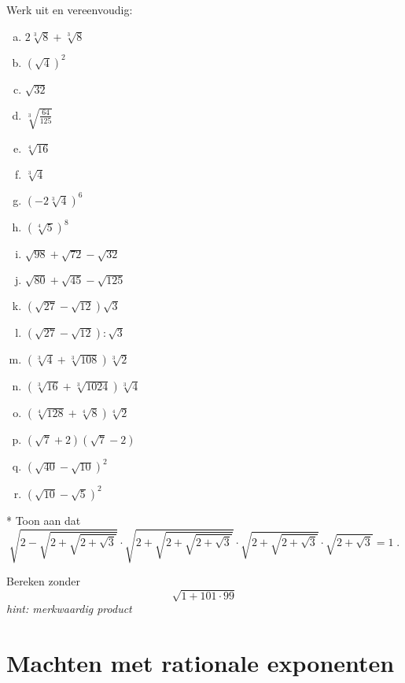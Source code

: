 \documentclass[12pt,twoside]{article}
\begin{document}
\begin{oefening}
Werk uit en vereenvoudig:
\begin{multicols}{3}
\begin{enumerate}[(a)]
  \item $2\sqrt[3]{8}+\sqrt[3]{8}$
  \item $\left(\sqrt{4}\right)^2$
  \item $\sqrt{32}$
  \item $\sqrt[3]{\frac{64}{125}}$
  \item $\sqrt[4]{16}$
  \item $\sqrt[3]{4}$
  \item $\left(-2\sqrt[3]{4}\right)^6$
  \item $\left(\sqrt[4]{5}\right)^8$
  \item $\sqrt{98}+\sqrt{72}-\sqrt{32}$
  \item $\sqrt{80}+\sqrt{45}-\sqrt{125}$
  \item $\left(\sqrt{27}-\sqrt{12}\right)\sqrt{3}$
  \item $\left(\sqrt{27}-\sqrt{12}\right):\sqrt{3}$
  \item $\left(\sqrt[3]{4}+\sqrt[3]{108}\right)\sqrt[3]{2}$
  \item $\left(\sqrt[3]{16}+\sqrt[3]{1024}\right)\sqrt[3]{4}$
  \item $\left(\sqrt[4]{128}+\sqrt[4]{8}\right)\sqrt[4]{2}$
  \item $\left(\sqrt{7}+2\right)\left(\sqrt{7}-2\right)$
  \item $\left(\sqrt{40}-\sqrt{10}\right)^2$
  \item $\left(\sqrt{10}-\sqrt{5}\right)^2$
\end{enumerate}
\end{multicols}
\end{oefening}

\begin{oefening}*
Toon aan dat
$$\sqrt{2-\sqrt{2+\sqrt{2+\sqrt{3}}}}\cdot\sqrt{2+\sqrt{2+\sqrt{2+\sqrt{3}}}}\cdot\sqrt{2+\sqrt{2+\sqrt{3}}}\cdot\sqrt{2+\sqrt{3}} = 1\;.$$
\end{oefening}

\begin{oefening}
Bereken zonder 
$$\sqrt{1+101\cdot99}$$
{\em hint: merkwaardig product}
\end{oefening}

\pagebreak
\section{Machten met rationale exponenten}
\end{document}
